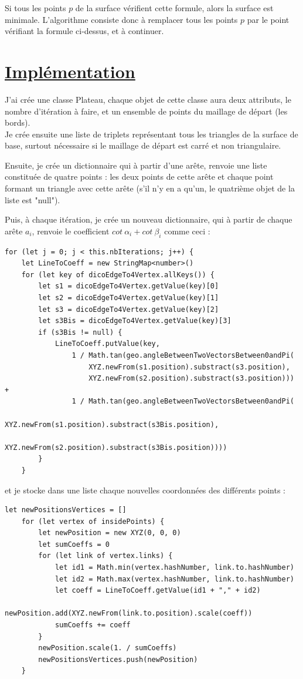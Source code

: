 \documentclass {report}
\begin{document}
Si tous les points $p$ de la surface vérifient cette formule, alors la surface est minimale. L'algorithme consiste donc à remplacer tous les points $p$ par le point vérifiant la formule ci-dessus, et à continuer.

\section[Implémentation]{\uline{Implémentation}}

J'ai crée une classe Plateau, chaque objet de cette classe aura deux attributs, le nombre d'itération à faire, et un ensemble de points du maillage de départ (les bords).\\
Je crée ensuite une liste de triplets représentant tous les triangles de la surface de base, surtout nécessaire si le maillage de départ est carré et non triangulaire.

Ensuite, je crée un dictionnaire qui à partir d'une arête, renvoie une liste constituée de quatre points : les deux points de cette arête et chaque point formant un triangle avec cette arête (s'il n'y en a qu'un, le quatrième objet de la liste est "null").

Puis, à chaque itération, je crée un nouveau dictionnaire, qui à partir de chaque arête $a_i$, renvoie le coefficient $cot\ \alpha_i + cot\ \beta_i$ comme ceci : 
\begin{lstlisting}[frame=single, framerule=0pt]
for (let j = 0; j < this.nbIterations; j++) {
	let LineToCoeff = new StringMap<number>()
	for (let key of dicoEdgeTo4Vertex.allKeys()) {
		let s1 = dicoEdgeTo4Vertex.getValue(key)[0]
		let s2 = dicoEdgeTo4Vertex.getValue(key)[1]
		let s3 = dicoEdgeTo4Vertex.getValue(key)[2]
		let s3Bis = dicoEdgeTo4Vertex.getValue(key)[3]
		if (s3Bis != null) {
			LineToCoeff.putValue(key,
				1 / Math.tan(geo.angleBetweenTwoVectorsBetween0andPi(
					XYZ.newFrom(s1.position).substract(s3.position),
					XYZ.newFrom(s2.position).substract(s3.position))) +
				1 / Math.tan(geo.angleBetweenTwoVectorsBetween0andPi(
					XYZ.newFrom(s1.position).substract(s3Bis.position),
					XYZ.newFrom(s2.position).substract(s3Bis.position))))
		}
	}
\end{lstlisting}

et je stocke dans une liste chaque nouvelles coordonnées des différents points : 

\begin{lstlisting}[frame=single, framerule=0pt]
	let newPositionsVertices = []
    for (let vertex of insidePoints) {
		let newPosition = new XYZ(0, 0, 0)
		let sumCoeffs = 0
		for (let link of vertex.links) {
			let id1 = Math.min(vertex.hashNumber, link.to.hashNumber)
			let id2 = Math.max(vertex.hashNumber, link.to.hashNumber)
			let coeff = LineToCoeff.getValue(id1 + "," + id2)
			newPosition.add(XYZ.newFrom(link.to.position).scale(coeff))
			sumCoeffs += coeff
		}
		newPosition.scale(1. / sumCoeffs)
		newPositionsVertices.push(newPosition)
	}
\end{lstlisting}
\end{document}
